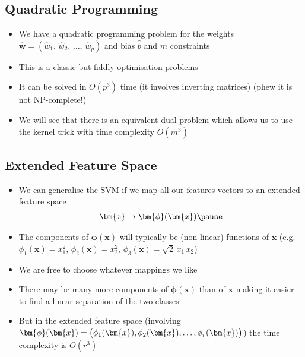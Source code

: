 \begin{slide}
\section{Quadratic Programming}

\begin{PauseHighLight}
  \begin{itemize}
  \item We have a quadratic programming problem for the weights
    $\hat{\bm{w}} = (\hat{w}_1,\,\hat{w}_2,\,\ldots,\,\hat{w}_p)$ and
    bias $\hat{b}$ and $m$ constraints\pause
  \item This is a classic but fiddly optimisation problems\pause
  \item It can be solved in $O(p^3)$ time (it involves inverting
    matrices)\pause{} (phew it is not NP-complete!)\pauseb
  \item We will see that there is an equivalent dual problem which
    allows us to use the kernel trick with time complexity $O(m^3)$\pause
  \end{itemize}
\end{PauseHighLight}

\end{slide}


\Outline %

\begin{slide}
\section[-2]{Extended Feature Space}

\begin{PauseHighLight}
  \begin{itemize}
  \item We can generalise the SVM if we map all our features vectors
    to an extended feature space
    \begin{align*}
      \bm{x} \rightarrow \bm{\phi}(\bm{x})\pause
    \end{align*}
  \item The components of $\bm{\phi}(\bm{x})$ will typically be
    (non-linear) functions of $\bm{x}$ (e.g. $\phi_1(\bm{x}) = x_1^2,
    \, \phi_2(\bm{x}) = x_2^2,\, \phi_3(\bm{x}) = \sqrt{2}\,
    x_1\,x_2$)\pause
  \item We are free to choose whatever mappings we like\pause
  \item There may be many more components of $\bm{\phi}(\bm{x})$ than
    of $\bm{x}$\pause{} making it easier to find a linear separation
    of the two classes\pauseb
      \item But in the extended feature space (involving
    $\bm{\phi}(\bm{x}) = \left(\strut \phi_1(\bm{x}), \phi_2(\bm{x}), \ldots,
      \phi_r(\bm{x})\right)$) the time complexity is $O(r^3)$\pause
  \end{itemize}
\end{PauseHighLight}

\end{slide}

